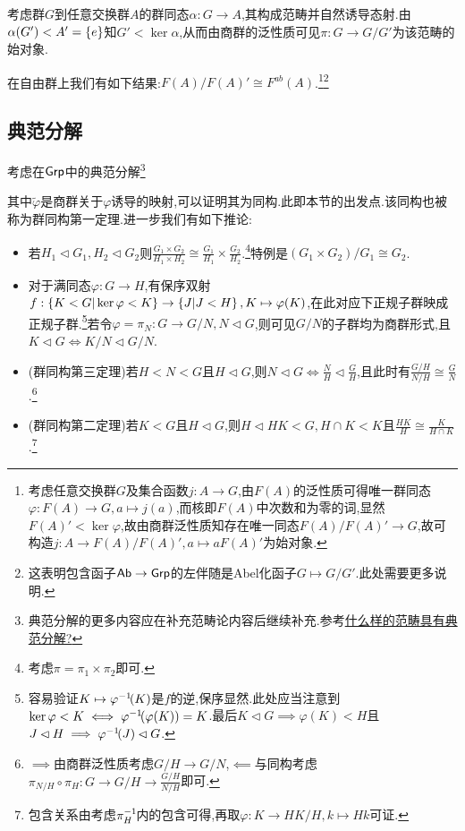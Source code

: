 \documentclass[11pt]{article} %
\begin{document}
考虑群$G$到任意交换群$A$的群同态$\alpha:G\to A$,其构成范畴并自然诱导态射.由$\alpha(G')<A'=\left\{e\right\}$知$G'<\ker\alpha$,从而由商群的泛性质可见$\pi:G\to G/G'$为该范畴的始对象.

在自由群上我们有如下结果:$F(A)/F(A)'\cong F^{ab}(A)$.\footnote{考虑任意交换群$G$及集合函数$j:A\to G$,由$F(A)$的泛性质可得唯一群同态$\varphi:F(A)\to G, a\mapsto j(a)$,而核即$F(A)$中次数和为零的词,显然$F(A)'<\ker\varphi$,故由商群泛性质知存在唯一同态$F(A)/F(A)'\to G$,故可构造$j:A\to F(A)/F(A)', a\mapsto aF(A)'$为始对象.}\footnote{这表明包含函子$\mathsf{Ab}\to\mathsf{Grp}$的左伴随是Abel化函子$G\mapsto G/G'$.此处需要更多说明.}

\subsection{典范分解}
考虑在$\mathsf{Grp}$中的典范分解\footnote{典范分解的更多内容应在补充范畴论内容后继续补充.参考\href{https://chaoli.club/index.php/10345}{什么样的范畴具有典范分解?}}
其中$\tilde{\varphi}$是商群关于$\varphi$诱导的映射,可以证明其为同构.此即本节的出发点.该同构也被称为群同构第一定理.进一步我们有如下推论:

\begin{itemize}
    \item 若$H_1\lhd G_1,H_2\lhd G_2$则$\frac{G_1\times G_2}{H_1\times H_2}\cong \frac{G_1}{H_1}\times \frac{G_2}{H_2}$.\footnote{考虑$\pi=\pi_1\times \pi_2$即可.}特例是$(G_1\times G_2)/G_1\cong G_2$.
    \item 对于满同态$\varphi:G\to H$,有保序双射$f:\left\{K<G|\ker\varphi<K\right\}\to \left\{J|J<H\right\}, K\mapsto \varphi(K)$,在此对应下正规子群映成正规子群.\footnote{容易验证$K\mapsto \varphi^{-1}\!(K)$是$f$的逆,保序显然.此处应当注意到$\ker\varphi<K\iff \varphi^{-1}\!(\varphi(K))=K$.最后$K\lhd G\implies \varphi(K)<H$且$J\lhd H\implies \varphi^{-1}\!(J)\lhd G$.}若令$\varphi=\pi_N:G\to G/N, N\lhd G$,则可见$G/N$的子群均为商群形式,且$K\lhd G\iff K/N\lhd G/N$.
    \item (群同构第三定理)若$H<N<G$且$H\lhd G$,则$N\lhd G\iff \frac{N}{H}\lhd\frac{G}{H}$,且此时有$\frac{G/H}{N/H}\cong\frac{G}{N}$.\footnote{$\implies$由商群泛性质考虑$G/H\to G/N$,$\impliedby$与同构考虑$\pi_{N/H}\circ\pi_H:G\to G/H\to\frac{G/H}{N/H}$即可.}
    \item (群同构第二定理)若$K<G$且$H\lhd G$,则$H\lhd HK<G,H\cap K<K$且$\frac{HK}{H}\cong\frac{K}{H\cap K}$.\footnote{包含关系由考虑$\pi_H^{-1}\!$内的包含可得,再取$\varphi:K\to HK/H, k\mapsto Hk$可证.}
\end{itemize}
\end{document}
